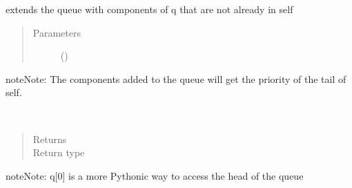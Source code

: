 \documentclass[letterpaper,10pt,english]{sphinxmanual}
\begin{document}
\begin{fulllineitems}
\begin{fulllineitems}
\end{fulllineitems}


\begin{fulllineitems}
\label{\detokenize{Reference:salabim.Queue.extend}}
extends the queue with components of q that are not already in self
\begin{quote}\begin{description}
\item[{Parameters}] \leavevmode
{} (\sphinxstyleliteralemphasis{\sphinxupquote{, }}) \textendash{} 

\end{description}\end{quote}

\begin{sphinxadmonition}{note}{Note:}
The components added to the queue will get the priority of the tail of self.
\end{sphinxadmonition}

\end{fulllineitems}


\begin{fulllineitems}
\label{\detokenize{Reference:salabim.Queue.head}}~\begin{quote}\begin{description}
\item[{Returns}] \leavevmode
{}

\item[{Return type}] \leavevmode
{\hyperref[\detokenize{Reference:salabim.Component}]{}}

\end{description}\end{quote}

\begin{sphinxadmonition}{note}{Note:}
q{[}0{]} is a more Pythonic way to access the head of the queue
\end{sphinxadmonition}


\end{fulllineitems}
\end{fulllineitems}
\end{document}

